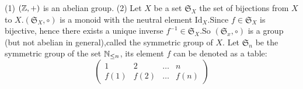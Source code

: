 \documentclass{book}
\numberwithin{equation}{section}
\begin{document}
\begin{exampleenv}
    \quad
    \newline
    (1) $(\mathbb{Z},+)$ is an abelian group.
    \newline
    (2) Let $X$ be a set $\mathfrak{S}_X$ the set of bijections from $X$ to $X$.$(\mathfrak{S}_X ,\circ)$ is a monoid with the neutral element $\mathrm{Id}_X$.Since $f\in \mathfrak{S}_X $ is bijective, hence there exists a unique inverse $f^{-1}\in \mathfrak{S} _X$.So $(\mathfrak{S} _x,\circ)$ is a group (but not abelian in general),called the symmetric group of $X$.
    \newline
    Let $\mathfrak{S} _n$ be the symmetric group of the set $\mathbb{N}_{\le n}$, its element $f$ can be denoted as a table:
    $$\begin{pmatrix}
  1&2  &\dots &n \\
  f(1)& f(2) &\dots   &f(n)
\end{pmatrix}$$
\end{exampleenv}
\end{document}
